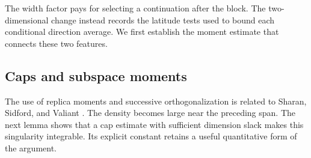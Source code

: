 The width factor pays for selecting a continuation after the block.
The two-dimensional change instead records the latitude tests used to
bound each conditional direction average. We first establish the moment
estimate that connects these two features.

\subsection{Caps and subspace moments}

The use of replica moments and successive orthogonalization is related
to Sharan, Sidford, and Valiant \cite[Section~7, Lemma~12]{SSV2019}.
The density becomes large near the preceding span. The next lemma
shows that a cap estimate with sufficient dimension slack makes this
singularity integrable. Its explicit constant retains a useful
quantitative form of the argument.

